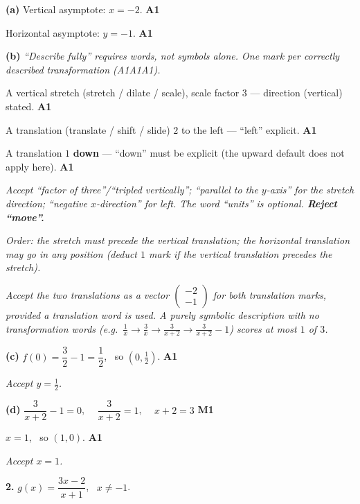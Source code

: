 \documentclass[12pt, twoside]{article}
\begin{document}
\medskip

\textbf{(a)} Vertical asymptote: $x=-2$. \hfill \textbf{A1}

Horizontal asymptote: $y=-1$. \hfill \textbf{A1}

\medskip

\textbf{(b)} \emph{``Describe fully'' requires words, not symbols alone. One mark
per correctly described transformation (A1A1A1).}

A vertical stretch (stretch / dilate / scale), scale factor $3$ --- direction (vertical) stated. \hfill \textbf{A1}

A translation (translate / shift / slide) $2$ to the left --- ``left'' explicit. \hfill \textbf{A1}

A translation $1$ \textbf{down} --- ``down'' must be explicit (the upward default does not apply here). \hfill \textbf{A1}

\emph{Accept ``factor of three''/``tripled vertically''; ``parallel to the $y$-axis''
for the stretch direction; ``negative $x$-direction'' for left. The word
``units'' is optional. \textbf{Reject ``move''.}}

\emph{Order: the stretch must precede the vertical translation; the horizontal
translation may go in any position (deduct $1$ mark if the vertical translation
precedes the stretch).}

\emph{Accept the two translations as a vector
$\left(\begin{smallmatrix}-2\\-1\end{smallmatrix}\right)$ for both translation marks,
provided a translation word is used. A purely symbolic description with no
transformation words (e.g.\ $\tfrac1x\to\tfrac3x\to\tfrac{3}{x+2}\to\tfrac{3}{x+2}-1$)
scores at most $1$ of $3$.}

\medskip

\textbf{(c)} $f(0)=\dfrac{3}{2}-1=\dfrac{1}{2}$, \ so $\left(0,\tfrac{1}{2}\right)$. \hfill \textbf{A1}

\emph{Accept $y=\tfrac{1}{2}$.}

\medskip

\textbf{(d)} $\dfrac{3}{x+2}-1=0$, \ \ $\dfrac{3}{x+2}=1$, \ \ $x+2=3$ \hfill \textbf{M1}

$x=1$, \ so $(1,0)$. \hfill \textbf{A1}

\emph{Accept $x=1$.}

\medskip

\noindent\textbf{2.} $\displaystyle g(x)=\dfrac{3x-2}{x+1}$, \ $x\ne -1$.
\end{document}
